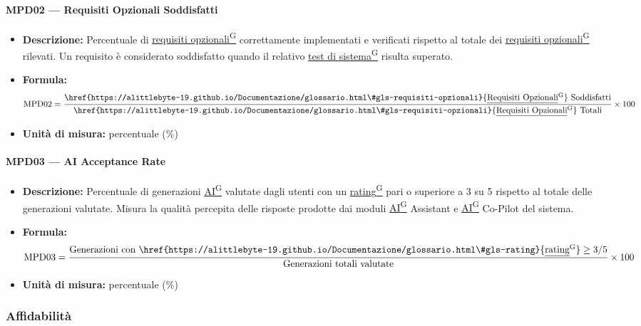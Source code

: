 \documentclass[a4paper,12pt]{article}
\providecommand{\glslink}[2]{\href{https://alittlebyte-19.github.io/Documentazione/glossario.html\#gls-#1}{\underline{#2}\textsuperscript{\scriptsize G}}}
\begin{document}
\paragraph{MPD02 --- Requisiti Opzionali Soddisfatti}
\begin{itemize}
    \item \textbf{Descrizione:} Percentuale di \glslink{requisiti-opzionali}{requisiti opzionali} correttamente implementati e verificati rispetto al totale dei \glslink{requisiti-opzionali}{requisiti opzionali} rilevati. Un requisito è considerato soddisfatto quando il relativo \glslink{test-di-sistema}{test di sistema} risulta superato.
    \item \textbf{Formula:}
    $$\text{MPD02} = \frac{\text{\glslink{requisiti-opzionali}{Requisiti Opzionali} Soddisfatti}}{\text{\glslink{requisiti-opzionali}{Requisiti Opzionali} Totali}} \times 100$$
    \item \textbf{Unità di misura:} percentuale (\%)
\end{itemize}

\paragraph{MPD03 --- AI Acceptance Rate}
\begin{itemize}
    \item \textbf{Descrizione:} Percentuale di generazioni \glslink{intelligenza-artificiale-ai}{AI} valutate dagli utenti con un \glslink{rating}{rating} pari o superiore a 3 su 5 rispetto al totale delle generazioni valutate. Misura la qualità percepita delle risposte prodotte dai moduli \glslink{intelligenza-artificiale-ai}{AI} Assistant e \glslink{intelligenza-artificiale-ai}{AI} Co-Pilot del sistema.
    \item \textbf{Formula:}
    $$\text{MPD03} = \frac{\text{Generazioni con \glslink{rating}{rating}} \geq 3/5}{\text{Generazioni totali valutate}} \times 100$$
    \item \textbf{Unità di misura:} percentuale (\%)
\end{itemize}

\subsubsection{Affidabilità}
\end{document}
